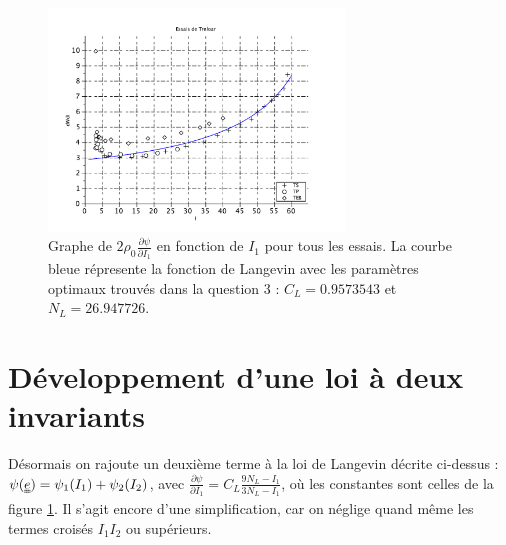 \documentclass[a4paper,11pt]{article}
\newcommand{\FRAC}{\displaystyle\frac}
\newcommand{\tens}{\uuline}
\begin{document}
\begin{figure}[!ht]
\centering
\includegraphics[width=0.7\textwidth]{scilab_prof/q32.pdf}
\caption{Graphe de $2 \rho_0 \frac{\partial\psi}{\partial I_1}$ en fonction de $I_1$ pour tous les essais. La courbe bleue répresente la fonction de Langevin avec les paramètres optimaux trouvés dans la question 3 : $C_L = 0.9573543$ et $N_L=26.947726$.}
\label{fig:32}
\end{figure}

\section{Développement d'une loi à deux invariants}
Désormais on rajoute un deuxième terme à la loi de Langevin décrite ci-dessus : $\psi(\tens{e}) = \psi_1(I_1) + \psi_2(I_2)$, avec $\FRAC{\partial\psi}{\partial I_1} = C_L\frac{9N_L-I_1}{3N_L-I_1}$, où les constantes sont celles de la figure \ref{fig:32}. Il s'agit encore d'une simplification, car on néglige quand même les termes croisés $I_1I_2$ ou supérieurs.
\end{document}
